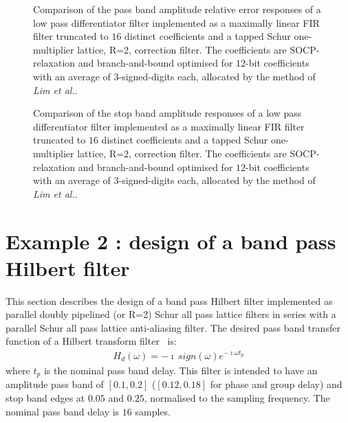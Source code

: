 \documentclass[a4paper,twoside,10pt,english]{article}
\newcommand{\DesignOfSchurLatticeFiltersPdfScale}{1}
\begin{document}
\begin{figure}
\centering
\scalebox{\DesignOfSchurLatticeFiltersPdfScale}{}
\caption{Comparison of the pass band amplitude relative error responses of a low
  pass differentiator filter implemented as a maximally linear FIR filter
  truncated to $16$ distinct coefficients and a tapped Schur one-multiplier
  lattice, R=2, correction filter. The coefficients are SOCP-relaxation and
  branch-and-bound optimised for $12$-bit coefficients with an average of
  $3$-signed-digits each, allocated by the method of \emph{Lim et al.}\;.}
\label{fig:Comp-schurOneMlattice-lowpass-diff-R2-12-nbits-Schur-FIR-pass-relative}
\end{figure}

\begin{figure}
\centering
\scalebox{\DesignOfSchurLatticeFiltersPdfScale}{}
\caption{Comparison of the stop band amplitude responses of a low pass
  differentiator filter implemented as a maximally linear FIR filter truncated
  to $16$ distinct coefficients and a tapped Schur one-multiplier lattice, R=2,
  correction filter. The coefficients are SOCP-relaxation and branch-and-bound
  optimised for $12$-bit coefficients with an average of
  $3$-signed-digits each, allocated by the method of \emph{Lim et al.}\;.}
\label{fig:Comp-schurOneMlattice-lowpass-diff-R2-12-nbits-Schur-FIR-stop}
\end{figure}

\clearpage
\section{Example 2 : design of a band pass Hilbert  filter}
This section describes the design of a band pass Hilbert filter implemented
as parallel doubly pipelined (or R=2) Schur all pass lattice filters in series
with a parallel Schur all pass lattice anti-aliasing filter. The desired pass
band transfer function of a Hilbert transform
filter~\cite[p.118]{Papoulis_SignalAnalysis} is:
\begin{align*}
H_{d}\left(\omega\right)=-\imath\, sign\left(\omega\right)e^{-\imath\omega t_{p}}
\end{align*}
where $t_{p}$ is the nominal pass band delay. This filter is intended to have
an amplitude pass band of $\left[0.1,0.2\right]$ ($\left[0.12,0.18\right]$ for
phase and group delay) and stop band edges at $0.05$ and $0.25$, normalised to
the sampling frequency. The nominal pass band delay is $16$ samples.
\end{document}
